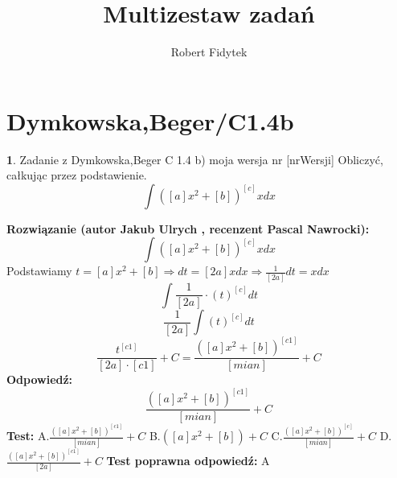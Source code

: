 \documentclass[12pt, a4paper]{article}
\title{Multizestaw zadań}
\author{Robert Fidytek}
\date{}
\theoremstyle{definition} %
\newtheorem{zad}{}
\newcommand{\kategoria}[1]{\section{#1}} %
\newcommand{\zadStart}[1]{\begin{zad}#1\newline} %
\newcommand{\zadStop}{\end{zad}}   %
\newcommand{\rozwStart}[2]{\noindent \textbf{Rozwiązanie (autor #1 , recenzent #2): }\newline} %
\newcommand{\rozwStop}{\newline}                                            %
\newcommand{\odpStart}{\noindent \textbf{Odpowiedź:}\newline}    %
\newcommand{\odpStop}{\newline}                                             %
\newcommand{\testStart}{\noindent \textbf{Test:}\newline} %
\newcommand{\testStop}{\newline} %
\newcommand{\kluczStart}{\noindent \textbf{Test poprawna odpowiedź:}\newline} %
\newcommand{\kluczStop}{\newline} %
\begin{document}
\maketitle


\kategoria{Dymkowska,Beger/C1.4b}
\zadStart{Zadanie z Dymkowska,Beger C 1.4 b) moja wersja nr [nrWersji]}
Obliczyć, całkując przez podstawienie.$$\int([a]x^{2}+[b])^{[c]}xdx$$
\zadStop
\rozwStart{Jakub Ulrych}{Pascal Nawrocki}
$$\int([a]x^{2}+[b])^{[c]}xdx$$
Podstawiamy $t=[a]x^{2}+[b]\Rightarrow dt=[2a]xdx \Rightarrow\frac{1}{[2a]}dt=xdx$
$$\int\frac{1}{[2a]}\cdot(t)^{[c]}dt$$
$$\frac{1}{[2a]}\int(t)^{[c]}dt$$
$$\frac{t^{[c1]}}{[2a]\cdot[c1]}+C=\frac{([a]x^{2}+[b])^{[c1]}}{[mian]}+C$$
\rozwStop
\odpStart
$$\frac{([a]x^{2}+[b])^{[c1]}}{[mian]}+C$$
\odpStop
\testStart
A.$\frac{([a]x^{2}+[b])^{[c1]}}{[mian]}+C$
B.$([a]x^{2}+[b])+C$
C.$\frac{([a]x^{2}+[b])^{[c]}}{[mian]}+C$
D.$\frac{([a]x^{2}+[b])^{[c1]}}{[2a]}+C$
\testStop
\kluczStart
A
\kluczStop
\end{document}
